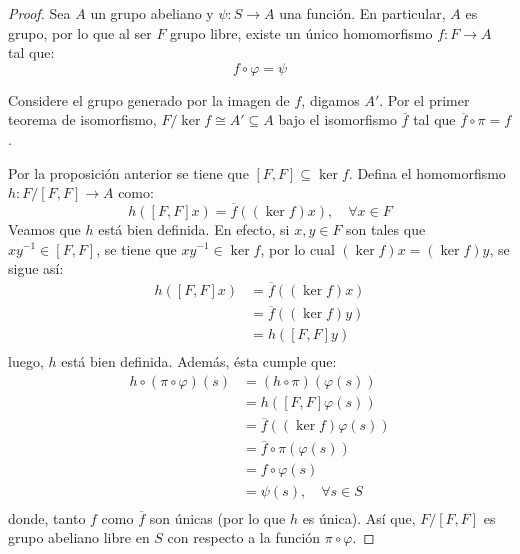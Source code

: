 \documentclass[12pt]{report}
\theoremstyle{largebreak}
\newcommand\cf[3]{\ensuremath{#1:#2\rightarrow#3}}
\begin{document}
    \begin{proof}
        Sea $A$ un grupo abeliano y $\cf{\psi}{S}{A}$ una función. En particular, $A$ es grupo, por lo que al ser $F$ grupo libre, existe un único homomorfismo $\cf{f}{F}{A}$ tal que:
        \begin{equation*}
            f\circ\varphi=\psi
        \end{equation*}
    
        Considere el grupo generado por la imagen de $f$, digamos $A'$. Por el primer teorema de isomorfismo, $F/\ker f\cong A'\subseteq A $ bajo el isomorfismo $\overline{f}$ tal que $\overline{f}\circ\pi=f$.

        Por la proposición anterior se tiene que $[F,F]\subseteq\ker f$. Defina el homomorfismo $\cf{h}{F/[F,F]}{A}$ como:
        \begin{equation*}
            h\left([F,F]x\right)=\overline{f}((\ker f)x),\quad\forall x\in F
        \end{equation*}
        Veamos que $h$ está bien definida. En efecto, si $x,y\in F$ son tales que $xy^{-1}\in [F,F]$, se tiene que $xy^{-1}\in\ker f$, por lo cual $(\ker f)x=(\ker f)y$, se sigue así:
        \begin{equation*}
            \begin{split}
                h([F,F]x)&=\overline{f}((\ker f)x)\\
                &=\overline{f}((\ker f)y)\\
                &=h([F,F]y)\\
            \end{split}
        \end{equation*}
        luego, $h$ está bien definida. Además, ésta cumple que:
        \begin{equation*}
            \begin{split}
                h\circ(\pi\circ\varphi)(s)&=(h\circ\pi)(\varphi(s))\\
                &=h([F,F]\varphi(s))\\
                &=\overline{f}((\ker f)\varphi(s))\\
                &=\overline{f}\circ\pi(\varphi(s))\\
                &=f\circ\varphi(s)\\
                &=\psi(s),\quad\forall s\in S \\
            \end{split}
        \end{equation*}
        donde, tanto $f$ como $\overline{f}$ son únicas (por lo que $h$ es única). Así que, $F/[F,F]$ es grupo abeliano libre en $S$ con respecto a la función $\pi\circ\varphi$.
    \end{proof}
\end{document}
